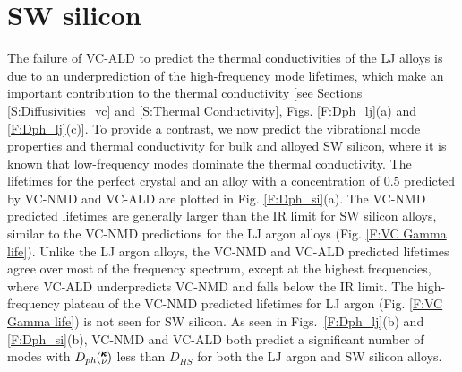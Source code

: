 
\section{\label{S:SW}SW silicon}

The failure of VC-ALD to predict the thermal conductivities of the LJ 
alloys is due to an underprediction of the high-frequency mode lifetimes, 
which make an important contribution to the thermal conductivity 
[see Sections \ref{S:Diffusivities_vc} and \ref{S:Thermal Conductivity}, 
Figs. \ref{F:Dph_lj}(a) and \ref{F:Dph_lj}(c)]. To provide a contrast, 
we now predict the vibrational mode properties and thermal conductivity for bulk 
and alloyed SW silicon, where it is known that low-frequency modes 
dominate the thermal conductivity.
\cite{sellan_size_2010,sellan_cross-plane_2010} 
The lifetimes for the perfect crystal and an alloy with a concentration of 
0.5 predicted by VC-NMD and VC-ALD are plotted in Fig. \ref{F:Dph_si}(a). 
The VC-NMD predicted lifetimes are generally larger than 
the IR limit for SW silicon alloys, similar 
to the VC-NMD predictions for the LJ argon alloys 
(Fig. \ref{F:VC Gamma life}). Unlike the 
LJ argon alloys, the  
VC-NMD and VC-ALD predicted lifetimes agree over most 
of the frequency spectrum, except at the highest frequencies, where 
VC-ALD underpredicts VC-NMD and falls below the IR limit. 
The high-frequency plateau of the VC-NMD predicted lifetimes 
for LJ argon (Fig. \ref{F:VC Gamma life}) is not seen for SW silicon. 
As seen in Figs.~\ref{F:Dph_lj}(b) 
and \ref{F:Dph_si}(b), VC-NMD and VC-ALD both predict a significant 
number of modes with  
$D_{ph}\mspace{-4.0mu}\left(\mspace{-8.0mu} \begin{smallmatrix}&\pmb{\kappa} \\&\nu\end{smallmatrix} \mspace{-3.0mu}\right)$ less than $D_{HS}$ for both the LJ argon and 
SW silicon alloys. 

